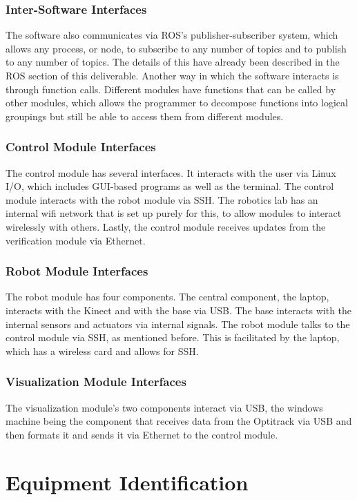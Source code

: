 \documentclass{article}
\newcommand\tab[1][0.5cm]{\hspace*{#1}}
\begin{document}
\subsubsection{Inter-Software Interfaces}
\tab The software also communicates via ROS’s publisher-subscriber system, which allows any process, or node, to subscribe to any number of topics and to publish to any number of topics. The details of this have already been described in the ROS section of this deliverable. Another way in which the software interacts is through function calls. Different modules have functions that can be called by other modules, which allows the programmer to decompose functions into logical groupings but still be able to access them from different modules.

\subsubsection{Control Module Interfaces}
\tab The control module has several interfaces. It interacts with the user via Linux I/O, which includes GUI-based programs as well as the terminal.  The control module interacts with the robot module via SSH. The robotics lab has an internal wifi network that is set up purely for this, to allow modules to interact wirelessly with others. Lastly, the control module receives updates from the verification module via Ethernet.

\subsubsection{Robot Module Interfaces}
\tab The robot module has four components. The central component, the laptop, interacts with the Kinect and with the base via USB. The base interacts with the internal sensors and actuators via internal signals. The robot module talks to the control module via SSH, as mentioned before. This is facilitated by the laptop, which has a wireless card and allows for SSH.

\subsubsection{Visualization Module Interfaces}
\tab The visualization module’s two components interact via USB, the windows machine being the component that receives data from the Optitrack via USB and then formats it and sends it via Ethernet to the control module.


\section{Equipment Identification}
\end{document}
